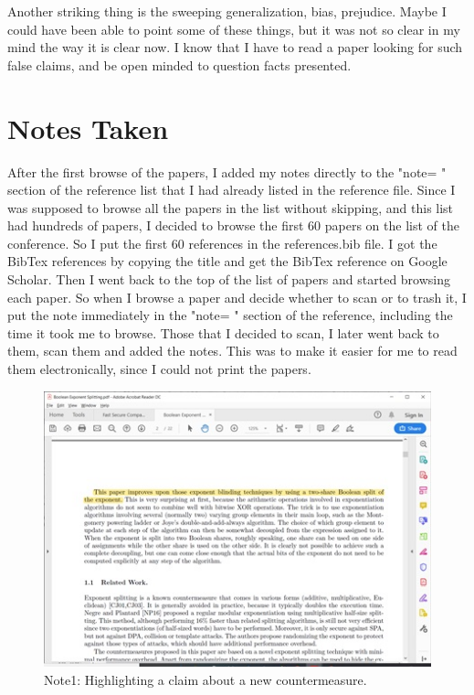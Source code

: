\documentclass{IEEEtran}
\begin{document}
Another striking thing is the sweeping generalization, bias, prejudice. Maybe I could have been able to point some of these things, but it was not so clear in my mind the way it is clear now. I know that I have to read a paper looking for such false claims, and be open minded to question facts presented. 


\section{Notes Taken}
After the first browse of the papers, I added my notes directly to the "note= " section of the reference list that I had already listed in the reference file. Since I was supposed to browse all the papers in the list without skipping, and this list had hundreds of papers, I decided to browse the first 60 papers on the list of the conference. So I put the first 60 references in the references.bib file. I got the BibTex references by copying the title and get the BibTex reference on Google Scholar. Then I went back to the top of the list of papers and started browsing each paper. So when I browse a paper and decide whether to scan or to trash it, I put the note immediately in the "note= " section of the reference, including the time it took me to browse. Those that I decided to scan, I later went back to them, scan them and added the notes. This was to make it easier for me to read them electronically, since I could not print the papers. 

\begin{figure}[ht!]
\centering
\includegraphics[scale=0.75]{Note1.jpg}
\caption{Note1: Highlighting a claim about a new countermeasure. \cite{tunstall2018boolean}}
\label{fig:Note1}
\end{figure}
\end{document}
